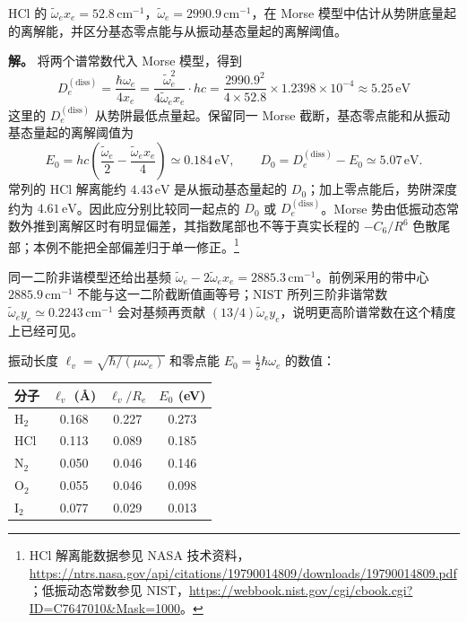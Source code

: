 \begin{exbox}
HCl 的 \(\tilde\omega_ex_e=52.8\,\mathrm{cm}^{-1}\)，\(\tilde\omega_e=2990.9\,\mathrm{cm}^{-1}\)，在 Morse 模型中估计从势阱底量起的离解能，并区分基态零点能与从振动基态量起的离解阈值。

\textbf{解。} 将两个谱常数代入 Morse 模型，得到
\[
D_e^{(\mathrm{diss})}=\frac{\hbar\omega_e}{4x_e}=\frac{\tilde\omega_e^2}{4\tilde\omega_ex_e}\cdot hc
=\frac{2990.9^2}{4\times52.8}\times1.2398\times10^{-4}\approx5.25\,\mathrm{eV}
\]
这里的 $D_e^{(\mathrm{diss})}$ 从势阱最低点量起。保留同一 Morse 截断，基态零点能和从振动基态量起的离解阈值为
\[
 E_0=hc\left(\frac{\tilde\omega_e}{2}-\frac{\tilde\omega_ex_e}{4}\right)
 \simeq0.184\,\mathrm{eV},\qquad
 D_0=D_e^{(\mathrm{diss})}-E_0\simeq5.07\,\mathrm{eV}.
\]
常列的 HCl 解离能约 $4.43\,\mathrm{eV}$ 是从振动基态量起的 $D_0$；加上零点能后，势阱深度约为 $4.61\,\mathrm{eV}$。因此应分别比较同一起点的 $D_0$ 或 $D_e^{(\mathrm{diss})}$。Morse 势由低振动态常数外推到离解区时有明显偏差，其指数尾部也不等于真实长程的 $-C_6/R^6$ 色散尾部；本例不能把全部偏差归于单一修正。\footnote{HCl 解离能数据参见 NASA 技术资料，\url{https://ntrs.nasa.gov/api/citations/19790014809/downloads/19790014809.pdf}；低振动态常数参见 NIST，\url{https://webbook.nist.gov/cgi/cbook.cgi?ID=C7647010&Mask=1000}。}

同一二阶非谐模型还给出基频 $\tilde\omega_e-2\tilde\omega_ex_e=2885.3\,\mathrm{cm}^{-1}$。前例采用的带中心 $2885.9\,\mathrm{cm}^{-1}$ 不能与这一二阶截断值画等号；NIST 所列三阶非谐常数 $\tilde\omega_ey_e\simeq0.2243\,\mathrm{cm}^{-1}$ 会对基频再贡献 $(13/4)\tilde\omega_ey_e$，说明更高阶谱常数在这个精度上已经可见。
\end{exbox}

振动长度 \(\ell_v=\sqrt{\hbar/(\mu\omega_e)}\) 和零点能 \(E_0=\frac12\hbar\omega_e\) 的数值：

\begin{center}
\begin{tabular}{lccc}
\hline
分子 & \(\ell_v\) (\AA) & \(\ell_v/R_e\) & \(E_0\) (eV) \\
\hline
H\(_2\) & 0.168 & 0.227 & 0.273 \\
HCl & 0.113 & 0.089 & 0.185 \\
N\(_2\) & 0.050 & 0.046 & 0.146 \\
O\(_2\) & 0.055 & 0.046 & 0.098 \\
I\(_2\) & 0.077 & 0.029 & 0.013 \\
\hline
\end{tabular}
\end{center}

